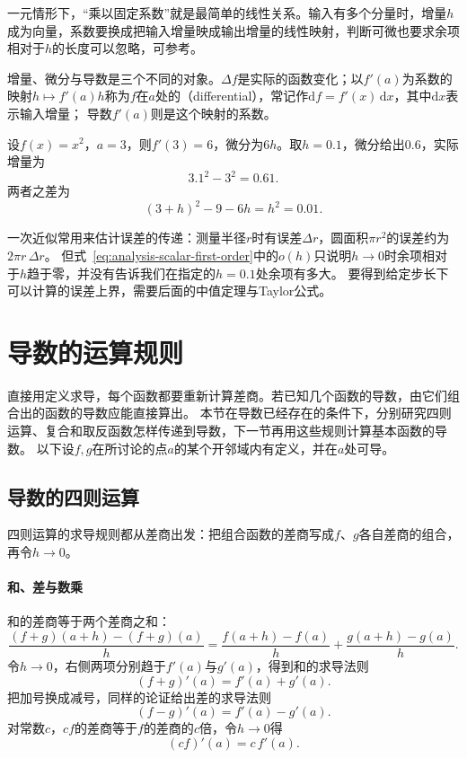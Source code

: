 一元情形下，“乘以固定系数”就是最简单的线性关系。输入有多个分量时，增量$h$成为向量，系数要换成把输入增量映成输出增量的线性映射，判断可微也要求余项相对于$h$的长度可以忽略，可参考。

增量、微分与导数是三个不同的对象。$\Delta f$是实际的函数变化；以$f'(a)$为系数的映射$h\mapsto f'(a)h$称为$f$在$a$处的（differential），常记作$\mathrm df=f'(x)\,\mathrm dx$，其中$\mathrm dx$表示输入增量；
导数$f'(a)$则是这个映射的系数。
\begin{example}[平方函数在$a=3$处的微分]
\label{ex:analysis-square-differential}
设$f(x)=x^2$，$a=3$，则$f'(3)=6$，微分为$6h$。取$h=0.1$，微分给出$0.6$，实际增量为
\[
 3.1^2-3^2=0.61.
\]
两者之差为
\[
 (3+h)^2-9-6h=h^2=0.01.
\]
\end{example}
一次近似常用来估计误差的传递：测量半径$r$时有误差$\Delta r$，圆面积$\pi r^2$的误差约为$2\pi r\,\Delta r$。
但式~\eqref{eq:analysis-scalar-first-order}中的$o(h)$只说明$h\to0$时余项相对于$h$趋于零，并没有告诉我们在指定的$h=0.1$处余项有多大。
要得到给定步长下可以计算的误差上界，需要后面的中值定理与Taylor公式。
\section{导数的运算规则}
\label{sec:ru-derivative-rules}
\label{sec:analysis-scalar-chain-rules}

直接用定义求导，每个函数都要重新计算差商。若已知几个函数的导数，由它们组合出的函数的导数应能直接算出。
本节在导数已经存在的条件下，分别研究四则运算、复合和取反函数怎样传递到导数，下一节再用这些规则计算基本函数的导数。
以下设$f,g$在所讨论的点$a$的某个开邻域内有定义，并在$a$处可导。

\subsection{导数的四则运算}
\label{sec:ru-derivative-arithmetic}

四则运算的求导规则都从差商出发：把组合函数的差商写成$f$、$g$各自差商的组合，再令$h\to0$。

\paragraph{和、差与数乘}
和的差商等于两个差商之和：
\[
 \frac{(f+g)(a+h)-(f+g)(a)}h=\frac{f(a+h)-f(a)}h+\frac{g(a+h)-g(a)}h.
\]
令$h\to0$，右侧两项分别趋于$f'(a)$与$g'(a)$，得到和的求导法则
\[
 (f+g)'(a)=f'(a)+g'(a).
\]
把加号换成减号，同样的论证给出差的求导法则
\[
 (f-g)'(a)=f'(a)-g'(a).
\]
对常数$c$，$cf$的差商等于$f$的差商的$c$倍，令$h\to0$得
\[
 (cf)'(a)=c\,f'(a).
\]

